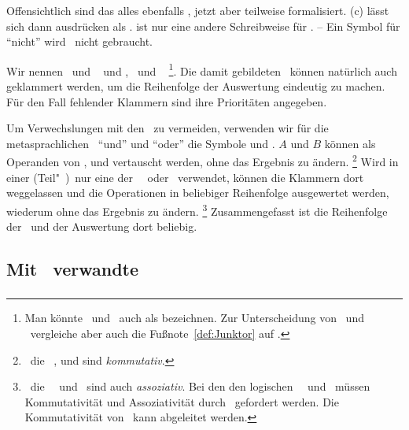 Offensichtlich sind das alles ebenfalls \Aussagen, jetzt aber teilweise formalisiert.
(c) lässt sich dann ausdrücken als .
 ist nur eine andere Schreibweise für .
-- Ein Symbol für "`nicht"' wird \hier\ nicht gebraucht.

Wir nennen \MtsAnd\ und \MtsOr\  und \MtsImp, \MtsRep\ und \MtsEquiv\ %
\footnote{%
	Man könnte \Metaoperationen\ und \Metarelationen\ auch als  bezeichnen.
	Zur Unterscheidung von \Operationen\ und \Relationen\ vergleiche aber auch die Fußnote~\ref{def:Junktor} auf .
}.
Die damit gebildeten \Aussagen\ können natürlich auch geklammert werden, um die Reihenfolge der Auswertung eindeutig zu machen.
Für den Fall fehlender Klammern sind ihre Prioritäten  angegeben.

Um Verwechslungen mit den \Junktoren\ zu vermeiden, verwenden wir für die metasprachlichen \Operationen\ "`und"' und "`oder"' die Symbole \chrqt{\MtsAnd} und \chrqt{\MtsOr}.
$A$ und $B$ können als Operanden von \chrqt{\MtsEquiv}, \chrqt{\MtsAnd} und \chrqt{\MtsOr} vertauscht werden, ohne das Ergebnis zu ändern.%
\footnote{%
	\textDh\ die \Operationen\ \chrqt{\MtsEquiv}, \chrqt{\MtsAnd} und \chrqt{\MtsOr} sind \emph{kommutativ}.
}
Wird in einer (Teil"~)\Aussage\ nur eine der \Operationen\ \MtsAnd\ oder \MtsOr\ verwendet, können die Klammern dort weggelassen und die Operationen in beliebiger Reihenfolge ausgewertet werden, wiederum ohne das Ergebnis zu ändern.%
\footnote{%
	\textDh\ die \Operationen\ \MtsAnd\ und \MtsOr\ sind auch \emph{assoziativ}.
	Bei den den logischen \Operationen\ \OjkAnd\ und \OjkOr\ müssen Kommutativität und Assoziativität durch \Axiome\ gefordert werden.
	Die Kommutativität von \MtsEquiv\ kann abgeleitet werden.
}
Zusammengefasst ist die Reihenfolge der \Operationen\ und der Auswertung dort beliebig.

\subsection[Mit Gleichheit verwandte Relationen]{Mit \Gleichheit\ verwandte \Relationen}
\label     {sub:Gleichheit}

\subsubsection[Vergleichbar]{\Vergleichbar}%
\label {subsub:Vergleichbar}

